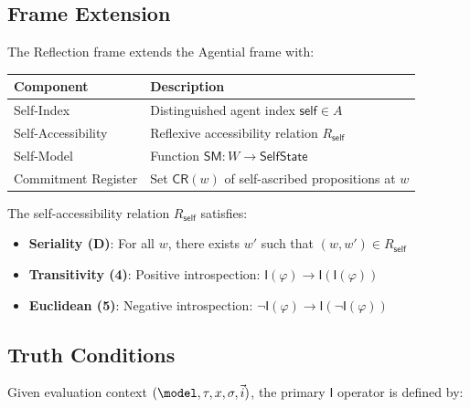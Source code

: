 \documentclass[../LogosReference.tex]{subfiles}
\begin{document}

\subsection{Frame Extension}\label{sec:reflection-frame}

The Reflection frame extends the Agential frame with:

\begin{center}
\begin{tabular}{ll}
\toprule
\textbf{Component} & \textbf{Description} \\
\midrule
Self-Index & Distinguished agent index $\mathsf{self} \in A$ \\
Self-Accessibility & Reflexive accessibility relation $R_{\mathsf{self}}$ \\
Self-Model & Function $\mathsf{SM}: W \to \mathsf{SelfState}$ \\
Commitment Register & Set $\mathsf{CR}(w)$ of self-ascribed propositions at $w$ \\
\bottomrule
\end{tabular}
\end{center}

The self-accessibility relation $R_{\mathsf{self}}$ satisfies:
\begin{itemize}
\item \textbf{Seriality (D)}: For all $w$, there exists $w'$ such that $(w, w') \in R_{\mathsf{self}}$
\item \textbf{Transitivity (4)}: Positive introspection: $\mathsf{I}(\varphi) \to \mathsf{I}(\mathsf{I}(\varphi))$
\item \textbf{Euclidean (5)}: Negative introspection: $\neg\mathsf{I}(\varphi) \to \mathsf{I}(\neg\mathsf{I}(\varphi))$
\end{itemize}


\subsection{Truth Conditions}\label{sec:reflection-truth}

Given evaluation context $(\model, \history, x, \assignment, \vec{i})$, the primary $\mathsf{I}$ operator is defined by:
\end{document}
